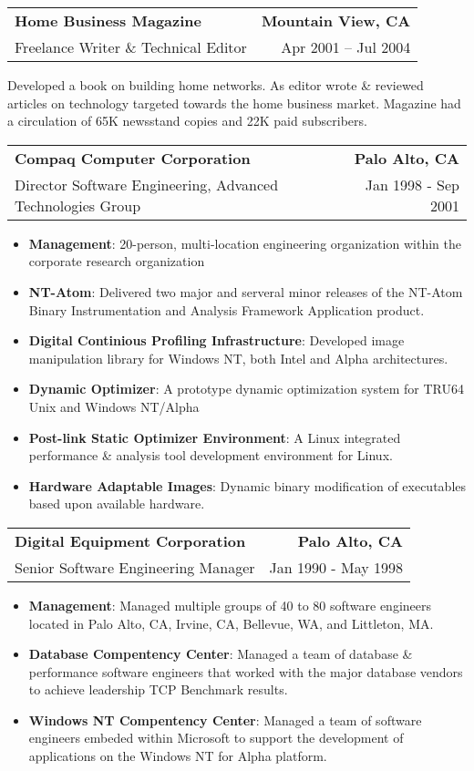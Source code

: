 \documentclass[letterpaper,11pt]{article}
\makeatletter
\newcommand{\resumeSubheading}[4]{
  \vspace{-1pt}
    \item
    \begin{tabular*}{1.0\textwidth}[t]{l@{\extracolsep{\fill}}r}
      \textbf{\Large#1} & \textbf{#2} \\
      {\large #3} & {\large #4}
    \end{tabular*}\vspace{-5pt}
  }
\newcommand{\resumeJobDescription}[1][]{
    \vspace{-1pt}\par{#1}
}
\newcommand{\resumeItem}[2]{\item{{\textbf{\small#1}}: {\small#2 \vspace{-1pt}}}}
\newcommand{\resumeItemListStart}{\begin{itemize}}
\newcommand{\resumeItemListEnd}{\end{itemize}}\vspace{-10pt}
\makeatother
\begin{document}
          \resumeSubheading
            {Home Business Magazine}{Mountain View, CA}
            {Freelance Writer \& Technical Editor} {Apr 2001 – Jul 2004}
            \resumeJobDescription {Developed a book on building home networks. As editor wrote \& reviewed articles on technology targeted 
              towards the home business market. Magazine had a circulation of 65K newsstand copies and 22K paid subscribers.}

          \resumeSubheading
            {Compaq Computer Corporation}{Palo Alto, CA}
            {Director Software Engineering, Advanced Technologies Group}{Jan 1998 - Sep 2001}
            \resumeItemListStart
                \resumeItem{Management}{20-person, multi-location engineering organization within the corporate research organization}
                \resumeItem{NT-Atom}{Delivered two major and serveral minor releases of the NT-Atom Binary Instrumentation
                        and Analysis Framework Application product.}
                \resumeItem{Digital Continious Profiling Infrastructure}{Developed image manipulation library for Windows NT, both Intel and Alpha architectures.}
                \resumeItem{Dynamic Optimizer}{A prototype dynamic optimization system for TRU64 Unix and Windows NT/Alpha}
                \resumeItem{Post-link Static Optimizer Environment}{A Linux integrated performance \& analysis tool development environment for Linux.}
                \resumeItem{Hardware Adaptable Images}{Dynamic binary modification of executables based upon available hardware.}
            \resumeItemListEnd

        \resumeSubheading
          {Digital Equipment Corporation}{Palo Alto, CA}
          {Senior Software Engineering Manager }{Jan 1990 - May 1998}
               \resumeItemListStart
               \resumeItem{Management}{Managed multiple groups of 40 to 80 software engineers located in Palo Alto, CA, Irvine, CA, Bellevue, WA, and Littleton, MA.}
               \resumeItem{Database Compentency Center}{Managed a team of database \& performance software engineers that worked with 
                            the major database vendors to achieve leadership TCP Benchmark results.}
                \resumeItem{Windows NT Compentency Center}{Managed a team of software engineers embeded within Microsoft to support the development of applications
                            on the Windows NT for Alpha platform.}
            \resumeItemListEnd
\end{document}
